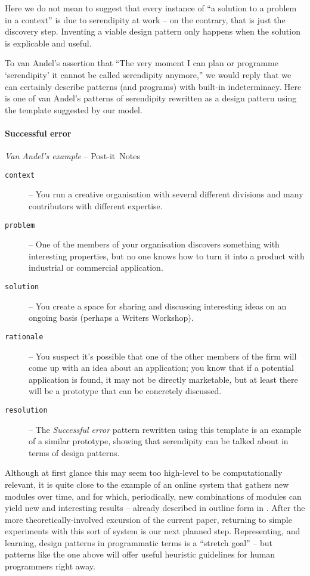 Here we do not mean to suggest that every instance of ``a solution to a
problem in a context'' is due to serendipity at work -- on the
contrary, that is just the discovery step.  Inventing a viable design pattern
only happens when the solution is explicable and useful.

To van Andel's assertion that ``The very moment I can plan or
programme `serendipity' it cannot be called serendipity anymore,'' we
would reply that we can certainly describe patterns (and programs)
with built-in indeterminacy.  Here is one of van Andel's patterns of
serendipity rewritten as a design pattern using the template suggested
by our model.

\begin{mdframed}
\vspace{-.35cm}
\paragraph{Successful error}
\emph{Van Andel's example} -- Post-it\texttrademark\ Notes\\[.05cm]
\begin{description}
\item[{\tt context}] -- You run a creative organisation with several different divisions and many contributors with different expertise.  
\item[{\tt problem}] -- One of the members of your organisation
  discovers something with interesting properties, but no one
  knows how to turn it into a product with industrial or commercial application.
\item[{\tt solution}] -- You create a space for sharing and discussing
  interesting ideas on an ongoing basis (perhaps a Writers Workshop).
\item[{\tt rationale}] -- You suspect it's possible that one of the
  other members of the firm will come up with an idea about an
  application; you know that if a potential application is found, it
  may not be directly marketable, but at least there will be a
  prototype that can be concretely discussed.
\item[{\tt resolution}] -- The \emph{Successful error} pattern
  rewritten using this template is an example of a similar
  prototype, showing that serendipity can be talked about in
  terms of design patterns.
\end{description}
\end{mdframed}

\bigskip

Although at first glance this may seem too high-level to be
computationally relevant, it is quite close to the example of an
online system that gathers new modules over time, and for which,
periodically, new combinations of modules can yield new and
interesting results -- already described in outline form in
\cite{pease2013discussion}.  After the more theoretically-involved
excursion of the current paper, returning to simple experiments with
this sort of system is our next planned step.  Representing, and
learning, design patterns in programmatic terms is a ``stretch goal''
-- but patterns like the one above will offer useful heuristic
guidelines for human programmers right away.  
